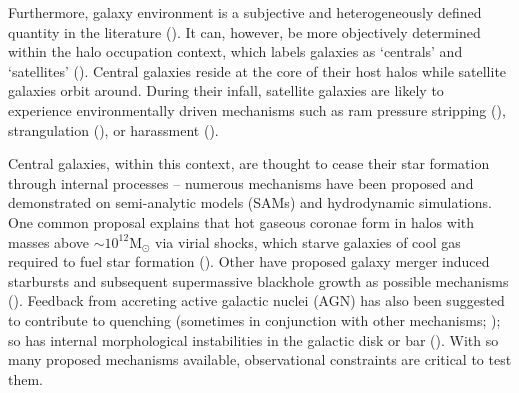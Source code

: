 Furthermore, galaxy environment is a subjective and heterogeneously 
defined quantity in the literature (\citealt{Muldrew:2012aa}). 
It can, however, be more objectively determined within 
the halo occupation context, which labels galaxies as `centrals' and `satellites'
(\citealt{Zheng:2005aa, Weinmann:2006aa, Blanton:2007ab, Tinker:2011aa}). 
Central galaxies reside at the core of their host halos while 
satellite galaxies orbit around. %
During their infall, satellite galaxies are likely to experience 
environmentally driven mechanisms such as ram pressure stripping 
(\citealt{Gunn:1972aa, Bekki:2009aa}),  strangulation 
(\citealt{Larson:1980aa, Balogh:2000aa}), or 
harassment (\citealt{Moore:1998aa}). 

Central galaxies, within this context, are thought to cease their 
star formation through internal processes -- numerous mechanisms have been 
proposed and demonstrated on semi-analytic models (SAMs) 
and hydrodynamic simulations.
One common proposal explains
that hot gaseous coronae form in halos with masses above 
$\sim 10^{12}\mathrm{M}_\odot$ via virial shocks, which starve galaxies 
of cool gas required to fuel star formation 
(\citealt{Birnboim:2003aa, Keres:2005aa,Croton:2006aa,Cattaneo:2006aa, Dekel:2006aa}). 
Other have proposed galaxy merger induced starbursts and subsequent
supermassive blackhole growth as possible mechanisms
(\citealt{Springel:2005aa, DiMatteo:2005aa, Hopkins:2006aa, Hopkins:2008ab, Hopkins:2008aa}). 
Feedback from accreting 
active galactic nuclei (AGN) has also been suggested to contribute to 
quenching (sometimes in conjunction with other mechanisms;
\citealt{Croton:2006aa,Cattaneo:2006aa,Gabor:2011aa}); so has internal 
morphological instabilities in the galactic disk or bar 
(\citealt{Cole:2000aa, Martig:2009aa}). With so many proposed mechanisms  
available, observational constraints are critical to test them.


